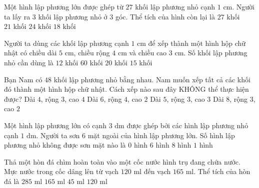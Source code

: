 \begin{ex} %
Một hình lập phương lớn được ghép từ $27$ khối lập phương nhỏ cạnh $1\text{ cm}$. Người ta lấy ra $3$ khối lập phương nhỏ ở $3$ góc. Thể tích của hình còn lại là
\choice
{$27\text{ khối}$}
{$21\text{ khối}$}
{\True $24\text{ khối}$}
{$18\text{ khối}$}
\end{ex}

\begin{ex} %
Người ta dùng các khối lập phương cạnh $1\text{ cm}$ để xếp thành một hình hộp chữ nhật có chiều dài $5\text{ cm}$, chiều rộng $4\text{ cm}$ và chiều cao $3\text{ cm}$. Số khối lập phương nhỏ cần dùng là
\choice
{$12$ khối}
{\True $60$ khối}
{$20$ khối}
{$15$ khối}
\end{ex}

\begin{ex} %
Bạn Nam có $48$ khối lập phương nhỏ bằng nhau. Nam muốn xếp tất cả các khối đó thành một hình hộp chữ nhật. Cách xếp nào sau đây KHÔNG thể thực hiện được?
\choice
{Dài $4$, rộng $3$, cao $4$}
{Dài $6$, rộng $4$, cao $2$}
{\True Dài $5$, rộng $3$, cao $3$}
{Dài $8$, rộng $3$, cao $2$}
\end{ex}

\begin{ex} %
Một hình lập phương lớn có cạnh $3\text{ dm}$ được ghép bởi các hình lập phương nhỏ cạnh $1\text{ dm}$. Người ta sơn $6$ mặt ngoài của hình lập phương lớn. Số hình lập phương nhỏ không được sơn mặt nào là
\choice
{$0$ hình}
{$6$ hình}
{$8$ hình}
{\True $1$ hình}
\end{ex}

\begin{ex} %
Thả một hòn đá chìm hoàn toàn vào một cốc nước hình trụ đang chứa nước. Mực nước trong cốc dâng lên từ vạch $120\text{ ml}$ đến vạch $165\text{ ml}$. Thể tích của hòn đá là
\choice
{$285\text{ ml}$}
{$165\text{ ml}$}
{\True $45\text{ ml}$}
{$120\text{ ml}$}
\end{ex}

